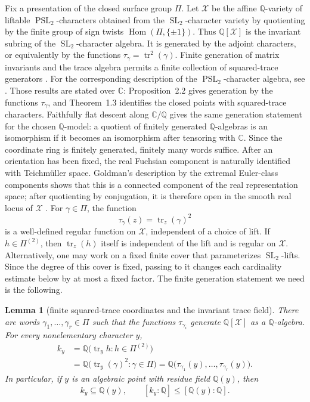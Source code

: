 \documentclass[11pt,reqno]{amsart}
\newtheorem{lemma}[theorem]{Lemma}
\theoremstyle{definition}
\theoremstyle{remark}
\newcommand{\C}{\mathbb C}
\newcommand{\Q}{\mathbb Q}
\newcommand{\Tr}{\operatorname{tr}}
\newcommand{\SL}{\operatorname{SL}}
\newcommand{\PSL}{\operatorname{PSL}}
\begin{document}
Fix a presentation of the closed surface group \(\Pi\).  Let
\(\mathcal X\) be the affine \(\Q\)-variety of liftable
\(\PSL_2\)-characters obtained from the \(\SL_2\)-character variety by
quotienting by the finite group of sign twists
\(\operatorname{Hom}(\Pi,\{\pm1\})\).  Thus \(\Q[\mathcal X]\) is the
invariant subring of the \(\SL_2\)-character algebra.  It is generated by
the adjoint characters, or equivalently by the functions
\(\tau_\gamma=\Tr^2(\gamma)\).  Finite generation of
matrix invariants and the trace algebra permits a finite collection of
squared-trace generators \cite{Procesi,Horowitz}.  For the corresponding
description of the \(\PSL_2\)-character algebra, see
\cite[Proposition~2.2 and Theorem~1.3]{HeusenerPorti}.
Those results are stated over \(\C\): Proposition~2.2 gives generation by
the functions \(\tau_\gamma\), and Theorem~1.3 identifies the closed points
with squared-trace characters.  Faithfully flat descent along
\(\C/\Q\) gives the same generation statement for the chosen
\(\Q\)-model: a quotient of finitely generated \(\Q\)-algebras is an
isomorphism if it becomes an isomorphism after tensoring with \(\C\).
Since the coordinate ring is finitely generated, finitely many words
suffice.
After an orientation has been fixed, the real Fuchsian component is naturally
identified with Teichm\"uller space.  Goldman's description by the extremal
Euler-class components shows that this is a connected component of the real
representation space; after quotienting by conjugation, it is therefore open
in the smooth real locus of \(\mathcal X\)
\cite[Corollary~C and Section~10.4]{GoldmanComponents}.
For \(\gamma\in\Pi\), the function
\[
 \tau_\gamma(z)=\Tr_z(\gamma)^2
\]
is a well-defined regular function on \(\mathcal X\), independent of a
choice of lift.  If \(h\in\Pi^{(2)}\), then \(\Tr_z(h)\) itself is
independent of the lift and is regular on \(\mathcal X\).
Alternatively, one may work on a fixed finite cover that parameterizes
\(\SL_2\)-lifts.  Since the degree of this cover is fixed, passing to it
changes each cardinality estimate below by at most a fixed factor.  The
finite generation statement we need is the following.

\begin{lemma}[finite squared-trace coordinates and the invariant trace field]
\label{lem:finite-trace-coordinates}
There are words \(\gamma_1,\ldots,\gamma_r\in\Pi\) such that the functions
\(\tau_{\gamma_i}\) generate \(\Q[\mathcal X]\) as a \(\Q\)-algebra.  For
every nonelementary character \(y\),
\begin{equation}\label{eq:invariant-trace-field-identity}
 \begin{split}
 k_y
 &=\Q\bigl(\Tr_y h:h\in\Pi^{(2)}\bigr)\\
 &=\Q\bigl(\Tr_y(\gamma)^2:\gamma\in\Pi\bigr)
  =\Q\bigl(\tau_{\gamma_1}(y),\ldots,
             \tau_{\gamma_r}(y)\bigr).
 \end{split}
\end{equation}
In particular, if \(y\) is an algebraic point with residue field \(\Q(y)\),
then
\begin{equation}\label{eq:trace-field-degree-bound}
 k_y\subseteq\Q(y),\qquad
 [k_y:\Q]\le[\Q(y):\Q].
\end{equation}
\end{lemma}
\end{document}
